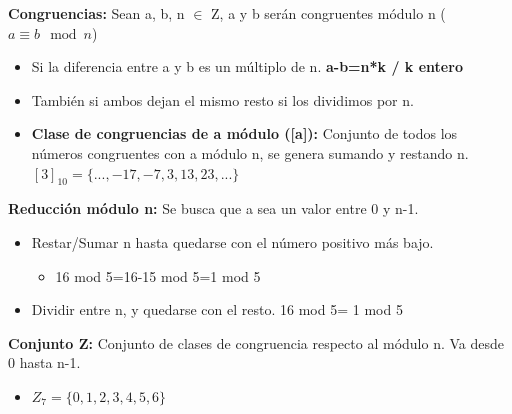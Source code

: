 \documentclass[12pt, twoside, openright]{report} %
\begin{document}
  
  \textbf{Congruencias:} Sean a, b, n $\in$ Z, a y b serán congruentes
  módulo n ($a \equiv b  \mod n$)
  

  \begin{itemize}
  \item Si la diferencia entre a y b es un múltiplo de n. \textbf{a-b=n*k /
    k entero}
    
  \item También si ambos dejan el mismo resto si los dividimos por n.
    
  \item \textbf{Clase de congruencias de a módulo ([a]):} Conjunto de
    todos los números congruentes con a módulo n, se genera sumando y
    restando n. $[3]_{10}=\{..., -17, -7, 3, 13, 23,...\}$
    
  \end{itemize}

  
  \textbf{Reducción módulo n:} Se busca que a sea un valor entre 0 y
  n-1.
  

  \begin{itemize}
  \item Restar/Sumar n hasta quedarse con el número positivo más bajo.
    

    \begin{itemize}
    \item 16 mod 5=16-15 mod 5=1 mod 5
      
    \end{itemize}
  \item Dividir entre n, y quedarse con el resto. 16 mod 5= 1 mod 5
    
  \end{itemize}

  
  \textbf{Conjunto Z:} Conjunto de clases de congruencia respecto al
  módulo n. Va desde 0 hasta n-1.
  

  \begin{itemize}
  \item $Z_7 = \{0, 1, 2, 3, 4, 5, 6\}$
    
  \end{itemize}
\end{document}
